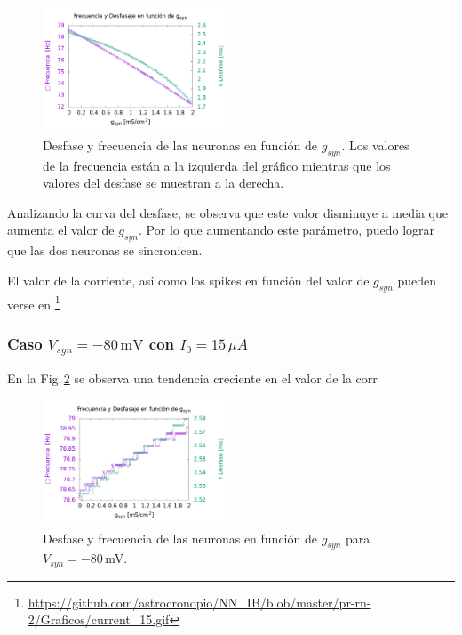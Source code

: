         \begin{figure}[H]
            \centering
            \includegraphics[width=0.5\textwidth]{../Graficos/current_15.png}
            \caption{Desfase y frecuencia de las neuronas en función de $g_{syn}$. Los valores de la frecuencia están a la izquierda del gráfico mientras que los valores del desfase se muestran a la derecha.}
            \label{fig:des_fre}
        \end{figure}  

    Analizando la curva del desfase, se observa que este valor disminuye a media que aumenta el valor de $g_{syn}$. Por lo que aumentando este parámetro, puedo lograr que las dos neuronas se sincronicen.

       El valor de la corriente, así como los spikes en función del valor de $g_{syn}$ pueden verse en \footnote{\url{https://github.com/astrocronopio/NN_IB/blob/master/pr-rn-2/Graficos/current_15.gif}}

  



    \subsubsection{Caso \texorpdfstring{$V_{syn}= -80\,\text{mV}$}{}   con  \texorpdfstring{$I_0 = 15\,\mu A$}{}}

    En la Fig.\,\ref{fig:des_fre_in} se observa una tendencia creciente en el valor de la corr


    \begin{figure}[H]
            \centering
            \includegraphics[width=0.5\textwidth]{../Graficos/current_15_in.png}
            \caption{Desfase y frecuencia de las neuronas en función de $g_{syn}$ para $V_{syn}=-80\,$mV.}
            \label{fig:des_fre_in}
        \end{figure}



